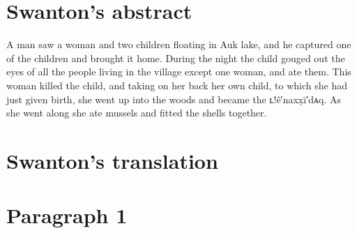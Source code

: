 \section{Swanton’s abstract}\label{sec:94-swanton-abstract}

A man saw a woman and two children floating in Auk lake, and he captured one of the children and brought it home.
During the night the child gouged out the eyes of all the people living in the village except one woman, and ate them.
This woman killed the child, and taking on her back her own child, to which she had just given birth, she went up into the woods and became the ʟ!ê′naxx̣ī′dᴀq.
As she went along she ate mussels and fitted the shells together.

\section{Swanton’s translation}\label{sec:94-swanton-translation}

\section{Paragraph 1}\label{sec:94-para-1}

